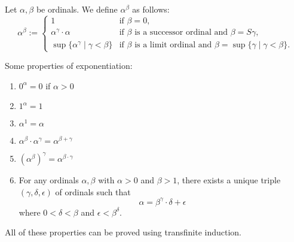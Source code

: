 \documentclass[12pt]{article}
\begin{document}
Let $\alpha,\beta$ be ordinals.  We define $\alpha^\beta$ as follows:
\begin{displaymath}
\alpha^\beta:= \left\{
\begin{array}{ll}
1 & \textrm{if }\beta=0,\\
\alpha^\gamma\cdot \alpha & \textrm{if $\beta$ is a successor ordinal and }\beta=S\gamma, \\
\sup\lbrace \alpha^\gamma \mid \gamma<\beta \rbrace & \textrm{if $\beta$ is a limit ordinal and }\beta=\sup\lbrace \gamma\mid \gamma<\beta\rbrace.
\end{array}
\right.
\end{displaymath}

Some properties of exponentiation:
\begin{enumerate}
\item $0^\alpha=0$ if $\alpha>0$
\item $1^\alpha=1$
\item $\alpha^1=\alpha$
\item $\alpha^\beta\cdot \alpha^\gamma=\alpha^{\beta+\gamma}$
\item $(\alpha^\beta)^\gamma=\alpha^{\beta\cdot\gamma}$
\item For any ordinals $\alpha,\beta$ with $\alpha>0$ and $\beta>1$, there exists a unique triple $(\gamma,\delta,\epsilon)$ of ordinals such that
$$\alpha=\beta^\gamma\cdot \delta+\epsilon$$
where $0<\delta<\beta$ and $\epsilon<\beta^\delta$.
\end{enumerate}

All of these properties can be proved using transfinite induction.
\end{document}
